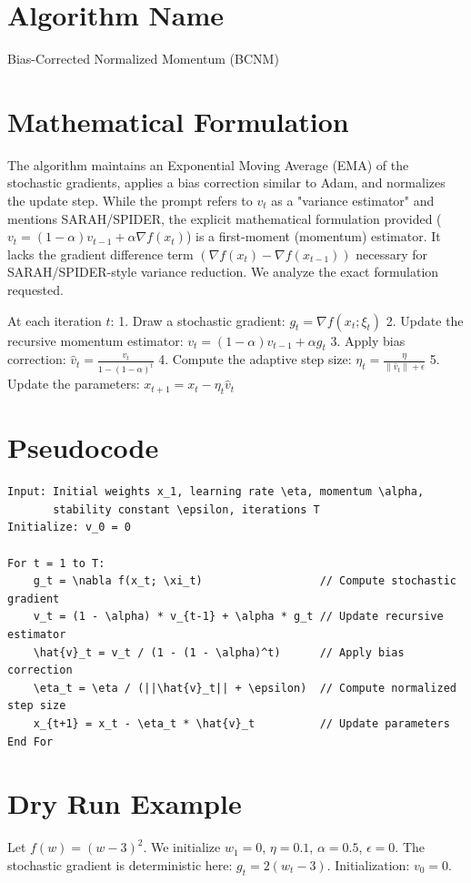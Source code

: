 \documentclass{article}
\begin{document}
\section*{Algorithm Name}
Bias-Corrected Normalized Momentum (BCNM)

\section*{Mathematical Formulation}
The algorithm maintains an Exponential Moving Average (EMA) of the stochastic gradients, applies a bias correction similar to Adam, and normalizes the update step. While the prompt refers to $v_t$ as a "variance estimator" and mentions SARAH/SPIDER, the explicit mathematical formulation provided ($v_t = (1-\alpha)v_{t-1} + \alpha \nabla f(x_t)$) is a first-moment (momentum) estimator. It lacks the gradient difference term $(\nabla f(x_t) - \nabla f(x_{t-1}))$ necessary for SARAH/SPIDER-style variance reduction. We analyze the exact formulation requested.

At each iteration $t$:
1. Draw a stochastic gradient: $g_t = \nabla f(x_t; \xi_t)$
2. Update the recursive momentum estimator: $v_t = (1-\alpha)v_{t-1} + \alpha g_t$
3. Apply bias correction: $\hat{v}_t = \frac{v_t}{1 - (1-\alpha)^t}$
4. Compute the adaptive step size: $\eta_t = \frac{\eta}{\|\hat{v}_t\| + \epsilon}$
5. Update the parameters: $x_{t+1} = x_t - \eta_t \hat{v}_t$

\section*{Pseudocode}
\begin{verbatim}
Input: Initial weights x_1, learning rate \eta, momentum \alpha, 
       stability constant \epsilon, iterations T
Initialize: v_0 = 0

For t = 1 to T:
    g_t = \nabla f(x_t; \xi_t)                  // Compute stochastic gradient
    v_t = (1 - \alpha) * v_{t-1} + \alpha * g_t // Update recursive estimator
    \hat{v}_t = v_t / (1 - (1 - \alpha)^t)      // Apply bias correction
    \eta_t = \eta / (||\hat{v}_t|| + \epsilon)  // Compute normalized step size
    x_{t+1} = x_t - \eta_t * \hat{v}_t          // Update parameters
End For
\end{verbatim}

\section*{Dry Run Example}
Let $f(w) = (w-3)^2$. We initialize $w_1 = 0$, $\eta = 0.1$, $\alpha = 0.5$, $\epsilon = 0$. The stochastic gradient is deterministic here: $g_t = 2(w_t - 3)$. Initialization: $v_0 = 0$.
\end{document}
